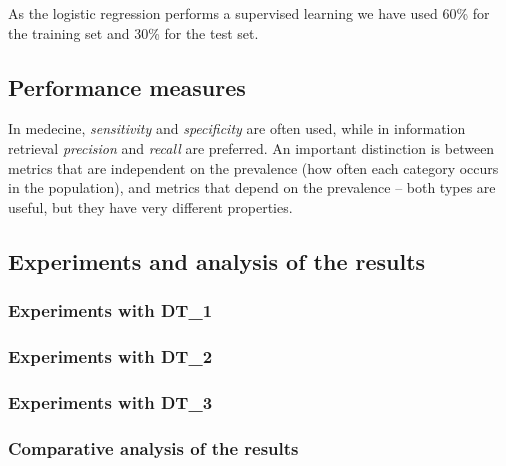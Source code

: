 As the logistic regression performs a supervised learning we have used 60\% for the training set and 30\% for the test set.

\subsection{Performance measures}
In medecine, \emph{sensitivity} and \emph{specificity} are often used, 
while in information retrieval \emph{precision} and \emph{recall} are preferred.
An important distinction is between metrics that are independent on the prevalence
(how often each category occurs in the population), and metrics that depend on the
prevalence – both types are useful, but they have very different properties.

\subsection{Experiments and analysis of the results}


\subsubsection{Experiments with DT\_1}
\subsubsection{Experiments with DT\_2}
\subsubsection{Experiments with DT\_3}
\subsubsection{Comparative analysis of the results}
